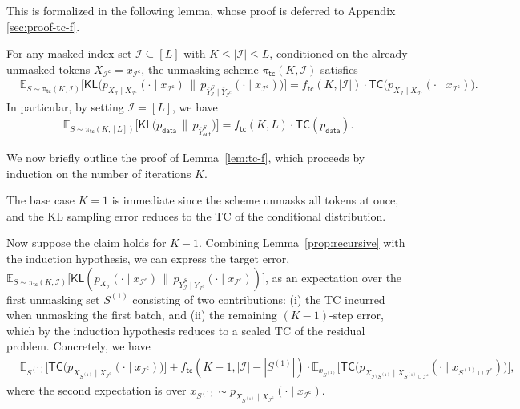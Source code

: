 \documentclass[english]{article}
\newcommand{\cI}{\mathcal{I}}
\newcommand{\KL}{\mathsf{KL}}
\newcommand{\data}{\mathsf{data}}
\newcommand{\setc}{\mathrm{c}}
\newcommand{\E}{\mathbb{E}}
\newcommand{\TC}{\mathsf{TC}}
\newcommand{\tc}{\mathsf{tc}}
\newcommand{\out}{\mathsf{out}}
\begin{document}
This is formalized in the following lemma, whose proof is deferred to Appendix \ref{sec:proof-tc-f}.
\begin{lemma}\label{lem:tc-f}
For any masked index set $ \cI \subseteq [L]$ with $K\leq |\cI| \leq L$, conditioned on the already unmasked tokens $ X_{\cI^\mathsf{c}} =x_{\cI^\mathsf{c}}$, the unmasking scheme $\pi_{\tc} (K,\cI)$ satisfies
\begin{align}\label{eq:tc-f}
    &\E_{S \sim \pi_{\tc}(K, \cI) } \Big[\KL \Big(p_{X_{\cI} \mid X_{\cI^\setc}}(\cdot \mid x_{\cI^\mathsf{c}}) \,\|\, p_{\overline Y^{S}_{\cI} \mid \overline Y_{\cI^\setc}}(\cdot \mid x_{\cI^\mathsf{c}} ) \Big) \Big] = f_\tc(K, |\cI|) \cdot \TC \big(p_{X_{\cI} \mid X_{\cI^\setc}}(\cdot \mid x_{\cI^\mathsf{c}})\big).
\end{align}
In particular, by setting $\cI = [L]$, we have
\begin{align}\label{eq:tc-f-final}
\E_{S \sim \pi_{\tc}(K, [L]) } \Big[\KL \big(p_{\data} \,\|\, p_{\overline Y^S_\out} \big) \Big] = f_\tc(K, L) \cdot \TC(p_\data).
\end{align}
\end{lemma}


We now briefly outline the proof of Lemma~\ref{lem:tc-f}, which proceeds by induction on the number of iterations $K$.

The base case $K=1$ is immediate since the scheme unmasks all tokens at once, and the KL sampling error reduces to the TC of the conditional distribution.

Now suppose the claim holds for $K-1$. Combining Lemma~\ref{prop:recursive} with the induction hypothesis, we can express the target error, 
$\E_{S \sim \pi_{\tc}(K, \cI)} \big[\KL(p_{X_{\cI}}(\cdot \mid x_{\cI^\mathsf{c}}) \,\|\, p_{\overline Y_{\cI}^S \mid \overline Y_{\cI^\setc}}(\cdot \mid x_{\cI^\mathsf{c}} ) ) \big]$, 
as an expectation over the first unmasking set $S^{(1)}$ consisting of two contributions: (i) the TC incurred when unmasking the first batch, and (ii) the remaining $(K-1)$-step error, which by the induction hypothesis reduces to a scaled TC of the residual problem. Concretely, we have
\begin{align*}
&\E_{S^{(1)}} \Big[ \TC \big(p_{X_{S^{(1)}} \mid X_{\cI^\setc}}(\cdot \mid x_{\cI^\mathsf{c}}) \big)\Big] + f_\tc(K - 1, |\cI| - |S^{(1)}|) \cdot \E_{x_{S^{(1)}} } \Big[\TC\big( p_{X_{\cI \setminus S^{(1)}} \mid X_{S^{(1)} \cup \cI^\mathsf{c}} }(\cdot \mid x_{S^{(1)} \cup \cI^\mathsf{c}})\big) \Big],
\end{align*}
where the second expectation is over $ x_{S^{(1)}} \sim p_{X_{S^{(1)}} \mid X_{\cI^\mathsf{c}}}(\cdot \mid x_{\cI^\mathsf{c}})$.
\end{document}
